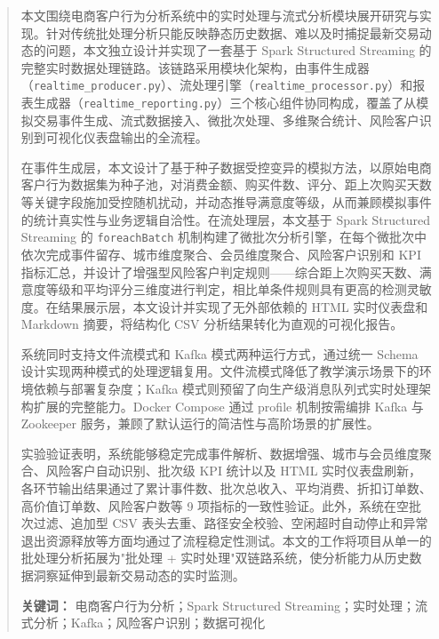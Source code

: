 \documentclass[12pt,hyperref,a4paper,UTF8]{ctexart}
\begin{document}
\cover
\clearpage
\begin{abstract}
本文围绕电商客户行为分析系统中的实时处理与流式分析模块展开研究与实现。针对传统批处理分析只能反映静态历史数据、难以及时捕捉最新交易动态的问题，本文独立设计并实现了一套基于 Spark Structured Streaming 的完整实时数据处理链路。该链路采用模块化架构，由事件生成器（\texttt{realtime\_producer.py}）、流处理引擎（\texttt{realtime\_processor.py}）和报表生成器（\texttt{realtime\_reporting.py}）三个核心组件协同构成，覆盖了从模拟交易事件生成、流式数据接入、微批次处理、多维聚合统计、风险客户识别到可视化仪表盘输出的全流程。

在事件生成层，本文设计了基于种子数据受控变异的模拟方法，以原始电商客户行为数据集为种子池，对消费金额、购买件数、评分、距上次购买天数等关键字段施加受控随机扰动，并动态推导满意度等级，从而兼顾模拟事件的统计真实性与业务逻辑自洽性。在流处理层，本文基于 Spark Structured Streaming 的 \texttt{foreachBatch} 机制构建了微批次分析引擎，在每个微批次中依次完成事件留存、城市维度聚合、会员维度聚合、风险客户识别和 KPI 指标汇总，并设计了增强型风险客户判定规则——综合距上次购买天数、满意度等级和平均评分三维度进行判定，相比单条件规则具有更高的检测灵敏度。在结果展示层，本文设计并实现了无外部依赖的 HTML 实时仪表盘和 Markdown 摘要，将结构化 CSV 分析结果转化为直观的可视化报告。

系统同时支持文件流模式和 Kafka 模式两种运行方式，通过统一 Schema 设计实现两种模式的处理逻辑复用。文件流模式降低了教学演示场景下的环境依赖与部署复杂度；Kafka 模式则预留了向生产级消息队列式实时处理架构扩展的完整能力。Docker Compose 通过 profile 机制按需编排 Kafka 与 Zookeeper 服务，兼顾了默认运行的简洁性与高阶场景的扩展性。

实验验证表明，系统能够稳定完成事件解析、数据增强、城市与会员维度聚合、风险客户自动识别、批次级 KPI 统计以及 HTML 实时仪表盘刷新，各环节输出结果通过了累计事件数、批次总收入、平均消费、折扣订单数、高价值订单数、风险客户数等 9 项指标的一致性验证。此外，系统在空批次过滤、追加型 CSV 表头去重、路径安全校验、空闲超时自动停止和异常退出资源释放等方面均通过了流程稳定性测试。本文的工作将项目从单一的批处理分析拓展为"批处理 + 实时处理"双链路系统，使分析能力从历史数据洞察延伸到最新交易动态的实时监测。

\textbf{关键词：} 电商客户行为分析；Spark Structured Streaming；实时处理；流式分析；Kafka；风险客户识别；数据可视化
\end{abstract}
\end{document}
